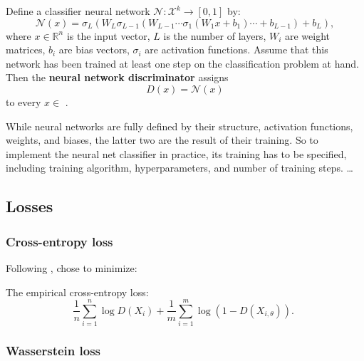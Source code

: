 \begin{definition}
    Define a classifier neural network $\mathcal{N}: \mathcal{X}^k \rightarrow [0, 1]$ by: %
    \begin{equation} 
        \mathcal{N}(x) = \sigma_L(W_L \sigma_{L-1}(W_{L-1} \cdots \sigma_1(W_1 x + b_1) \cdots + b_{L-1}) + b_L),
    \end{equation}
    where $x \in \mathbb{R}^n$ is the input vector, $L$ is the number of layers, $W_i$ are weight matrices, $b_i$ are bias vectors, $\sigma_i$ are activation functions. %
    Assume that this network has been trained at least one step on the classification problem at hand. %
    Then the \textbf{neural network discriminator} assigns
    \begin{equation}
        D(x) = \mathcal{N}(x)
    \end{equation}
    to every $x \in$ . %
\end{definition}

While neural networks are fully defined by their structure, activation functions, weights, and biases, the latter two are the result of their training.
So to implement the neural net classifier in practice, its training has to be specified, including training algorithm, hyperparameters, and number of training steps.
\dots

\subsection{Losses}
\label{sec:losses}

\subsubsection{Cross-entropy loss}
\label{sec:ce_loss}

Following \textcite{goodfellow2014generative}, \textcite{kaji2023adversarial} chose to minimize:

\begin{definition}
    The empirical cross-entropy loss:
    $$
    \frac{1}{n} \sum_{i=1}^n \log D\left(X_i\right)+\frac{1}{m} \sum_{i=1}^m \log \left(1-D\left(X_{i, \theta}\right)\right) \text {. }
    $$
    
\end{definition}


\subsubsection{Wasserstein loss}
\label{sec:wasserstein_loss}
